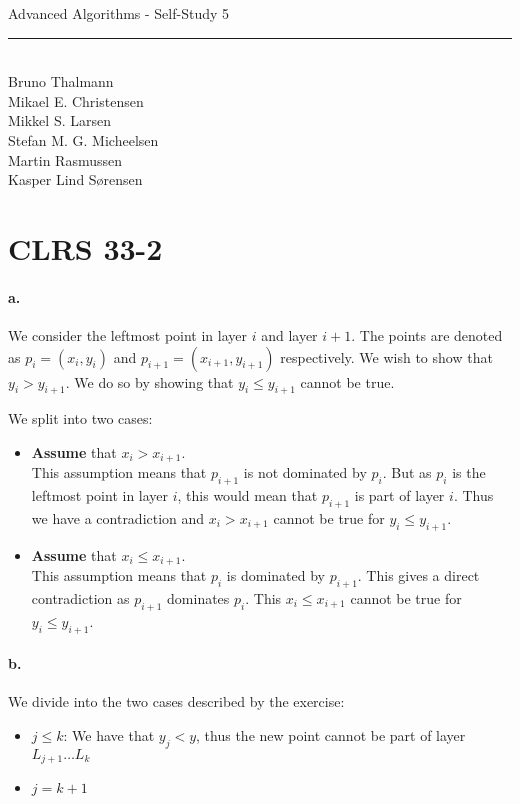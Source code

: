 
\newcommand{\HRule}{\rule{\linewidth}{0.5mm}}


\begin{titlepage}
\centering
{\LARGE Advanced Algorithms - Self-Study 5}
\HRule \\[0.5cm]
Bruno Thalmann\\
			Mikael E. Christensen\\
			Mikkel S. Larsen\\
			Stefan M. G. Micheelsen\\
			Martin Rasmussen\\
			Kasper Lind Sørensen			
\end{titlepage}

\section*{CLRS 33-2}
\paragraph{a.}We consider the leftmost point in layer $i$ and layer $i+1$.
The points are denoted as $p_i = (x_i, y_i)$ and $p_{i +1} = (x_{i +1}, y_{i +1})$ respectively.
We wish to show that $y_i > y_{i +1}$.
We do so by showing that $y_i \leq y_{i +1}$ cannot be true.

We split into two cases:
\begin{itemize}
\item \textbf{Assume} that $x_i > x_{i+1}$.
\\This assumption means that $p_{i+1}$ is not dominated by $p_i$.
But as $p_i$ is the leftmost point in layer $i$, this would mean that $p_{i+1}$ is part of layer $i$.
Thus we have a contradiction and $x_i > x_{i+1}$ cannot be true for $y_i \leq y_{i+1}$.
\item \textbf{Assume} that $x_i \leq x_{i+1}$.
\\This assumption means that $p_i$ is dominated by $p_{i+1}$.
This gives a direct contradiction as $p_{i+1}$ dominates $p_i$.
This $x_i \leq x_{i+1}$ cannot be true for $y_i \leq y_{i+1}$.
\end{itemize}

\paragraph{b.}We divide into the two cases described by the exercise:
\begin{itemize}
\item $j \leq k$: We have that $y_j < y$, thus the new point cannot be part of layer $L_{j+1} \dots L_k$
\item $j = k + 1$
\end{itemize}

